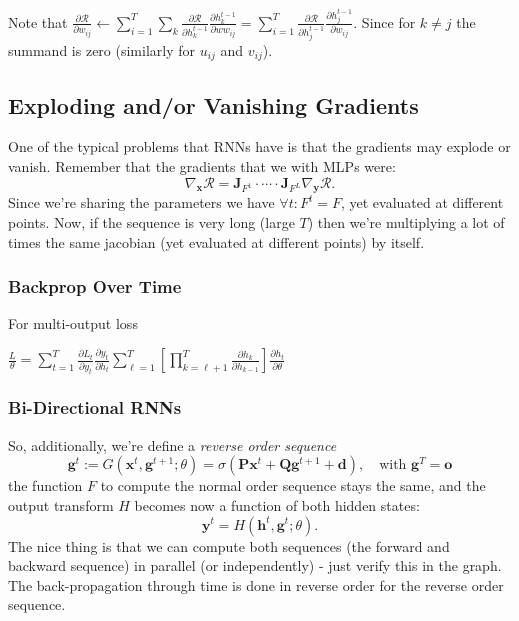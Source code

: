 \documentclass[a2paper,4pt]{extarticle}
\newcommand{\cR}{\mathcal{R}}
\newcommand{\mat}[1]{\mathbf{#1}}
\renewcommand{\vec}[1]{\mathbf{#1}}
\newcommand{\vd}{\vec{d}}
\newcommand{\vg}{\vec{g}}
\newcommand{\vh}{\vec{h}}
\newcommand{\vo}{\vec{o}}
\newcommand{\vx}{\vec{x}}
\newcommand{\vy}{\vec{y}}
\newcommand{\MJ}{\mat{J}}
\newcommand{\MP}{\mat{P}}
\newcommand{\MQ}{\mat{Q}}
\begin{document}
\begin{landscape}
\begin{multicols*}{7}
Note that
$
\frac{\partial \cR}{\partial w_{ij}}
\gets
\sum_{i=1}^T\sum_{k}
\frac{\partial \cR}{\partial h_k^{t-1}}
\frac{\partial h_k^{t-1}}{\partial ww_{ij}}
=
\sum_{i=1}^T
\frac{\partial \cR}{\partial h_j^{t-1}}
\frac{\partial h_j^{t-1}}{\partial w_{ij}}
$.
Since for $k\neq j$ the summand is zero (similarly for $u_{ij}$ and $v_{ij}$).

\subsection{Exploding and/or Vanishing Gradients}

One of the typical problems that RNNs have is that the gradients may explode or
vanish. Remember that the gradients that we with MLPs were:
\[
\nabla_{\vx}\cR=\MJ_{F^1}\cdot\cdots\cdot\MJ_{F^L}\nabla_{\vy}\cR.
\]
Since we're sharing the parameters we have $\forall t\colon F^t=F$, yet
evaluated at different points. Now, if the sequence is very long (large $T$)
then we're multiplying a lot of times the same jacobian (yet evaluated at
different points) by itself.



\subsubsection{Backprop Over Time}

For multi-output loss

$
\frac{L}{\theta}
=\sum_{t=1}^T
\frac{\partial L_t}{\partial y_t}
\frac{\partial y_t}{\partial h_t}
\sum_{\ell=1}^T
\left[
\prod_{k=\ell+1}^T
\frac{\partial h_k}{\partial h_{k-1}}
\right]
\frac{\partial h_t}{\partial \theta}
$


\subsubsection{Bi-Directional RNNs}

So, additionally, we're define a \emph{reverse order sequence}
\[
\vg^t:=G(\vx^t,\vg^{t+1};\theta)=\sigma(\MP\vx^t+\MQ\vg^{t+1}+\vd),
\quad\text{with }\vg^T=\vo
\]
the function $F$ to compute the normal order sequence stays the same, and the
output transform $H$ becomes now a function of both hidden states:
\[
\vy^t=H(\vh^t,\vg^t;\theta).
\]
The nice thing is that we can compute both sequences (the forward and backward
sequence) in parallel (or independently) - just verify this in the graph. The
back-propagation through time is done in reverse order for the reverse order
sequence.


\end{multicols*}
\end{landscape}
\end{document}
